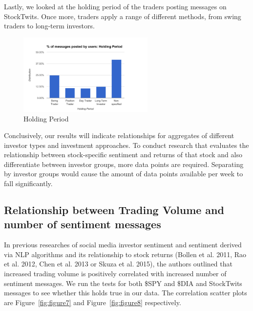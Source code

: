 Lastly, we looked at the holding period of the traders posting messages on StockTwits. Once more, traders apply a range of different methods, from swing traders to long-term investors. 

\begin{figure}[ht]
\centering
\includegraphics[width=0.6\textwidth]{figures/figure6.png}
\caption{\label{fig:figure6}Holding Period}
\end{figure}

Conclusively, our results will indicate relationships for aggregates of different investor types and investment approaches. To conduct research that evaluates the relationship between stock-specific sentiment and returns of that stock and also differentiate between investor groups, more data points are required. Separating by investor groups would cause the amount of data points available per week to fall significantly. 

\subsection{Relationship between Trading Volume and number of sentiment messages}
In previous researches of social media investor sentiment and sentiment derived via NLP algorithms and its relationship to stock returns (Bollen et al. 2011, Rao et al. 2012, Chen et al. 2013 or Skuza et al. 2015), the authors outlined that increased trading volume is positively correlated with increased number of sentiment messages. We run the tests for both \$SPY and \$DIA and StockTwits messages to see whether this holds true in our data. The correlation scatter plots 
are Figure~\ref{fig:figure7} and Figure~\ref{fig:figure8} respectively.

